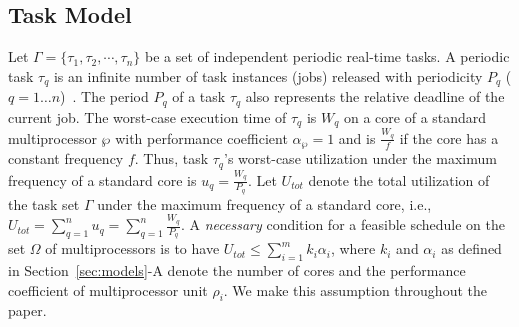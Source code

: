 \documentclass[conference]{IEEEtran}
\begin{document}



\subsection{Task Model}

Let  $\Gamma = \{\tau_1, \tau_2, \cdots, \tau_n\}$ be  a set of independent periodic real-time tasks.
A periodic task $\tau_q$ is an infinite number of task instances (jobs) released with periodicity $P_q$ ($q=1\ldots n$)~\cite{Liu00}. 
The period $P_q$ of a task $\tau_q$
also represents the relative deadline of the current job.
The worst-case execution time of $\tau_q$ is $W_q$ on a core of a standard multiprocessor $\wp$ with performance coefficient $\alpha_{\wp}=1$ and is 
$\frac{W_q}{f}$ if the core has a constant frequency $f$. 
Thus, task $\tau_q$'s worst-case utilization under the maximum frequency of a standard core is 
$u_q = \frac{W_q}{P_q}$. 
Let $U_{tot}$ denote the total 
utilization of the task set $\Gamma$ under the maximum frequency of a standard core, i.e., $U_{tot} = \sum_{q=1}^{n} u_q = \sum_{q=1}^{n} \frac{W_q}{P_q}$.
A \emph{necessary} condition for a feasible schedule on the set $\Omega$ of multiprocessors is to have
$U_{tot} \leq  \sum_{i=1}^{m} k_i \alpha_i $, where $k_i$ and $\alpha_i$ as defined in Section~\ref{sec:models}-A denote the number of cores and the performance coefficient of multiprocessor unit $\rho_i$.
We make this assumption throughout the paper.
%
%
\end{document}
